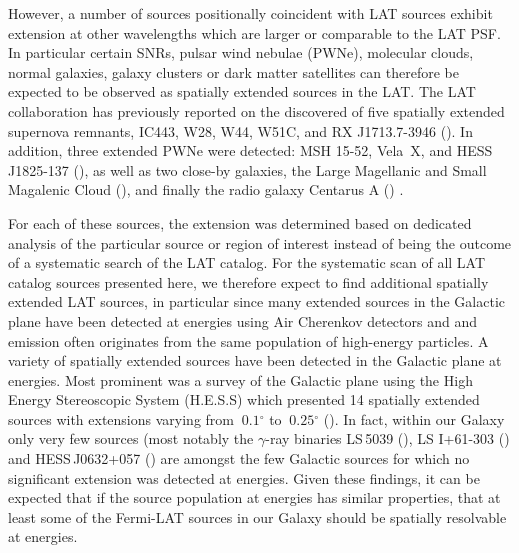 \documentclass[12pt,preprint]{aastex}
\newcommand{\gev}{\text{GeV}\xspace}
\newcommand{\tev}{\text{TeV}\xspace}
\renewcommand{\deg}{\ensuremath{^\circ}\xspace}
\begin{document}
However, a number of sources positionally coincident with LAT sources
exhibit extension at other wavelengths which are larger or comparable to
the LAT PSF.  In particular certain SNRs, pulsar wind nebulae (PWNe),
molecular clouds, normal galaxies, galaxy clusters or dark matter
satellites can therefore be expected to be observed as spatially extended
sources in the LAT.  The LAT collaboration has previously reported on the
discovered of five spatially extended supernova remnants, IC443, W28, W44,
W51C, and RX J1713.7-3946 (\cite{ic443,w28,w44,w51c,rx_j1713_lat}). In
addition, three extended PWNe were detected: MSH 15-52, Vela~X,
and HESS\,J1825-137 (\cite{msh1552,velax,fermi_hess_j1825}), as well
as two close-by galaxies, the Large Magellanic and Small Magalenic
Cloud (\cite{lmc,smc}), and finally the radio galaxy Centarus A
(\cite{cen_a_lat}) .

For each of these sources, the extension was determined based on
dedicated analysis of the particular source or region of interest
instead of being the outcome of a systematic search of the LAT catalog.
For the systematic scan of all LAT catalog sources presented here, we
therefore expect to find additional spatially extended LAT sources, in
particular since many extended sources in the Galactic plane have been
detected at \tev energies using Air Cherenkov detectors and \tev and
\gev emission often originates from the same population of high-energy
particles.  A variety of spatially extended sources have been detected
in the Galactic plane at \tev energies. Most prominent was a survey of
the Galactic plane using the High Energy Stereoscopic System (H.E.S.S)
which presented 14 spatially extended sources
 with extensions varying from
$~0.1\deg$ to $~0.25\deg$ (\cite{hess_plane_survey}). In fact, within
our Galaxy only very few sources (most notably the $\gamma$-ray binaries
LS\,5039 (\cite{HESSLS5039}), LS I+61-303 (\cite{MAGICLSI, VERITASLSI})
and HESS\,J0632+057 (\cite{HESS0632}) are amongst the few Galactic sources
for which no significant extension was detected at \tev energies. Given
these findings, it can be expected that if the source population at \gev
energies has similar properties, that at least some of the Fermi-LAT
sources in our Galaxy should be spatially resolvable at \gev energies.

\end{document}
